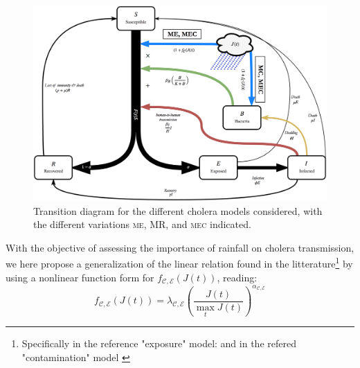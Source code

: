 \begin{figure}
  \centering
  \includegraphics{fig_cholera-rainfall/Lemaitre_ACTROP_2018_42_R1_fig1.png}
  \caption[Transition diagram for the competing cholera models]{Transition diagram for the different cholera models considered, with the different variations \textsc{me}, \textsc{MR}, and \textsc{mec} indicated.}
  \label{diagram}
\end{figure}
With the objective of assessing the importance of rainfall on cholera transmission, we here propose a generalization of the linear relation found in the litterature\footnote{Specifically in the reference "exposure" model: \parencite{Eisenberg:ExaminingRainfallCholera:2013} and in the refered "contamination" model \parencite{Rinaldo:Reassessment20102011:2012}} by using a nonlinear function form for  $f_{\mathcal{C,E}}\left(J(t)\right)$, reading:
\begin{equation}
    f_{\mathcal{C,E}}\left(J(t)\right)=\lambda_{\mathcal{C,E}} \left(\frac{J(t)}{\max_t J(t)}\right)^{\alpha_{\mathcal{C,E}}}
    \label{eq:nonlinear_rain}
\end{equation}
